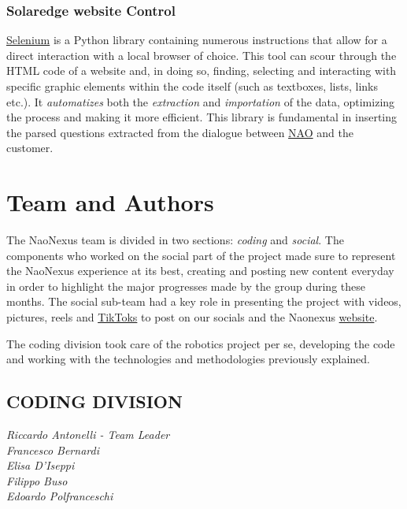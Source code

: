 \documentclass{optica-article}
\begin{document}
\subsubsection{Solaredge website Control}\label{sec:solaredge_website_control}
\hyperref[https://www.selenium.dev/documentation/]{Selenium} is a Python library containing numerous instructions that allow for a direct interaction with a local browser of choice. This tool can scour through the HTML code of a website and, in doing so, finding, selecting and interacting with specific graphic elements within the code itself (such as textboxes, lists, links etc.). It \emph{automatizes} both the \emph{extraction} and \emph{importation} of the data, optimizing the process and making it more efficient. This library is fundamental in inserting the parsed questions extracted from the dialogue between \hyperref[sec:solaredge_nao]{NAO} and the customer.

\section{Team and Authors}\label{sec:team_authors}
The NaoNexus team is divided in two sections: \emph{coding} and \emph{social}. The components who worked on the social part of the project made sure to represent the NaoNexus experience at its best, creating and posting new content everyday in order to highlight the major progresses made by the group during these months. The social sub-team had a key role in presenting the project with videos, pictures, reels and \hyperref[https://www.tiktok.com/@naonexus]{TikToks} to post on our socials and the Naonexus \hyperref[https://www.naonexus.altervista.org]{website}.

\bigskip
\noindent
The coding division took care of the robotics project per se, developing the code and working with the technologies and methodologies previously explained.\\

\subsection{CODING DIVISION}

\noindent\emph{Riccardo Antonelli - Team Leader}\\
\emph{Francesco Bernardi}\\
\emph{Elisa D'Iseppi}\\
\emph{Filippo Buso}\\
\emph{Edoardo Polfranceschi}\\
\end{document}
